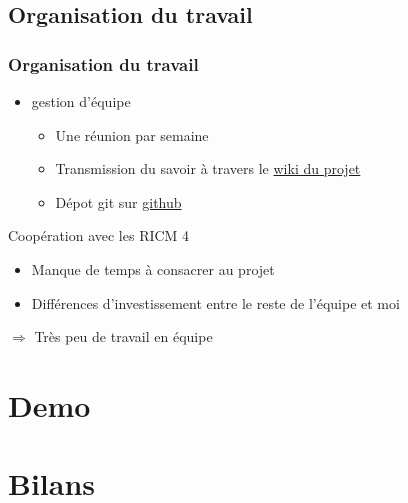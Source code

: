 \documentclass{beamer}
\begin{document}
		\subsection{Organisation du travail}
			\begin{frame}
			  \frametitle{Organisation du travail}
			  \begin{itemize}
			    \item gestion d'équipe
			    \begin{itemize}
			      \item Une réunion par semaine
			      \item Transmission du savoir à travers le \href{http://air.imag.fr/mediawiki/index.php/Proj-2012-2013-OAR-Cloud}{wiki du projet}
			      \item Dépot git sur \href{https://github.com/mickours/oar-cloud}{github}
			    \end{itemize}
			  \end{itemize}
			  \begin{alertblock}{Coopération avec les RICM 4}
			    \begin{itemize}
			      \item Manque de temps à consacrer au projet
			      \item Différences d'investissement entre le reste de l'équipe et moi
			    \end{itemize}
			    $\Rightarrow$ Très peu de travail en équipe
			  \end{alertblock}
			\end{frame}
		
	\section{Demo}
	
	\section{Bilans}
\end{document}
